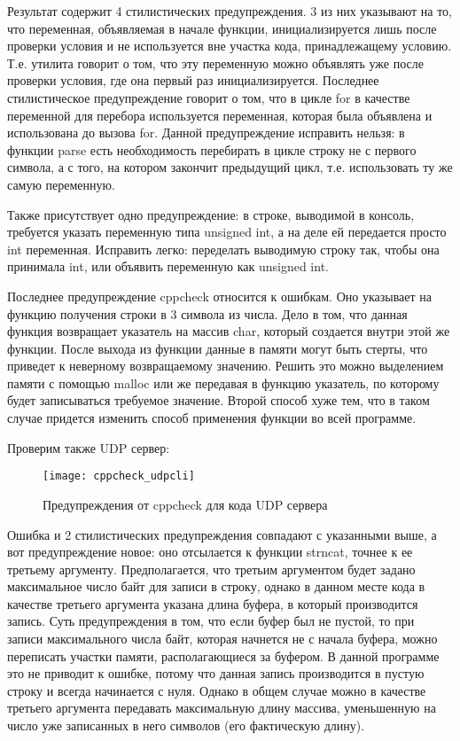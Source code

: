 Результат содержит 4 стилистических предупреждения. 
3 из них указывают на то, что переменная, объявляемая в начале функции, инициализируется лишь после проверки условия и не используется вне участка кода, принадлежащему условию. Т.е. утилита говорит о том, что эту переменную можно объявлять уже после проверки условия, где она первый раз инициализируется. 
Последнее стилистическое предупреждение говорит о том, что в цикле for в качестве переменной для перебора используется переменная, которая была объявлена и использована до вызова for. Данной предупреждение исправить нельзя: в функции parse есть необходимость перебирать в цикле строку не с первого символа, а с того, на котором закончит предыдущий цикл, т.е. использовать ту же самую переменную.

Также присутствует одно предупреждение: в строке, выводимой в консоль, требуется указать переменную типа unsigned int, а на деле ей передается просто int переменная. Исправить легко: переделать выводимую строку так, чтобы она принимала int, или объявить переменную как unsigned int.

Последнее предупреждение cppcheck относится к ошибкам. Оно указывает на функцию получения строки в 3 символа из числа. Дело в том, что данная функция возвращает указатель на массив char, который создается внутри этой же функции. После выхода из функции данные в памяти могут быть стерты, что приведет к неверному возвращаемому значению. Решить это можно выделением памяти с помощью malloc или же передавая в функцию указатель, по которому будет записываться требуемое значение. Второй способ хуже тем, что в таком случае придется изменить способ применения функции во всей программе.

Проверим также UDP сервер:
\begin{figure}[H]
	\begin{center}
		\texttt{[image: cppcheck\_udpcli]}
		\caption{Предупреждения от cppcheck для кода UDP сервера} 
		\label{pic:cppcheck2} %
	\end{center}
\end{figure}

Ошибка и 2 стилистических предупреждения совпадают с указанными выше, а вот предупреждение новое: оно отсылается к функции strncat, точнее к ее третьему аргументу. Предполагается, что третьим аргументом будет задано максимальное число байт для записи в строку, однако в данном месте кода в качестве третьего аргумента указана длина буфера, в который производится запись. Суть предупреждения в том, что если буфер был не пустой, то при записи максимального числа байт, которая начнется не с начала буфера, можно переписать участки памяти, располагающиеся за буфером. В данной программе это не приводит к ошибке, потому что данная запись производится в пустую строку и всегда начинается с нуля. Однако в общем случае можно в качестве третьего аргумента передавать максимальную длину массива, уменьшенную на число уже записанных в него символов (его фактическую длину).

